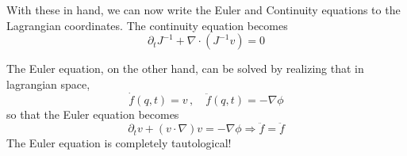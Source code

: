 With these in hand, we can now write the Euler and Continuity equations to the Lagrangian coordinates. The continuity equation becomes
\begin{equation}
	\partial_t J^{-1} + \nabla\cdot (J^{-1}v) = 0
\end{equation}

The Euler equation, on the other hand, can be solved by realizing that in lagrangian space, 
\begin{equation}
	\dot f(q,t) = v\,, \quad \ddot f(q,t) = -\nabla \phi
\end{equation}
so that the Euler equation becomes
\begin{equation}
	\partial_t v + (v\cdot\nabla)v = -\nabla\phi \Rightarrow \ddot f = \ddot f
\end{equation}
The Euler equation is completely tautological! 

